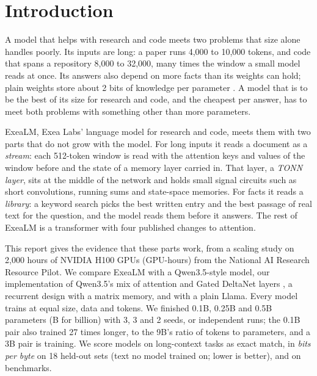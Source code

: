 \documentclass[10pt,twocolumn,letterpaper]{article}
\begin{document}
\section{Introduction}

A model that helps with research and code meets two problems that size alone handles poorly.
Its inputs are long: a paper runs 4,000 to 10,000 tokens, and code that spans a repository 8,000 to 32,000, many times the window a small model reads at once.
Its answers also depend on more facts than its weights can hold; plain weights store about 2 bits of knowledge per parameter \citep{allenzhu2024physics}.
A model that is to be the best of its size for research and code, and the cheapest per answer, has to meet both problems with something other than more parameters.

ExeaLM, Exea Labs' language model for research and code, meets them with two parts that do not grow with the model.
For long inputs it reads a document as a \emph{stream}: each 512-token window is read with the attention keys and values of the window before and the state of a memory layer carried in.
That layer, a \emph{TONN layer}, sits at the middle of the network and holds small signal circuits such as short convolutions, running sums and state-space memories.
For facts it reads a \emph{library}: a keyword search picks the best written entry and the best passage of real text for the question, and the model reads them before it answers.
The rest of ExeaLM is a transformer with four published changes to attention.

This report gives the evidence that these parts work, from a scaling study on 2,000 hours of NVIDIA H100 GPUs (GPU-hours) from the National AI Research Resource Pilot.
We compare ExeaLM with a Qwen3.5-style model, our implementation of Qwen3.5's mix of attention and Gated DeltaNet layers \citep{qwen35}, a recurrent design with a matrix memory, and with a plain Llama.
Every model trains at equal size, data and tokens.
We finished 0.1B, 0.25B and 0.5B parameters (B for billion) with 3, 3 and 2 seeds, or independent runs; the 0.1B pair also trained 27 times longer, to the 9B's ratio of tokens to parameters, and a 3B pair is training.
We score models on long-context tasks as exact match, in \emph{bits per byte} on 18 held-out sets (text no model trained on; lower is better), and on benchmarks.
\end{document}
